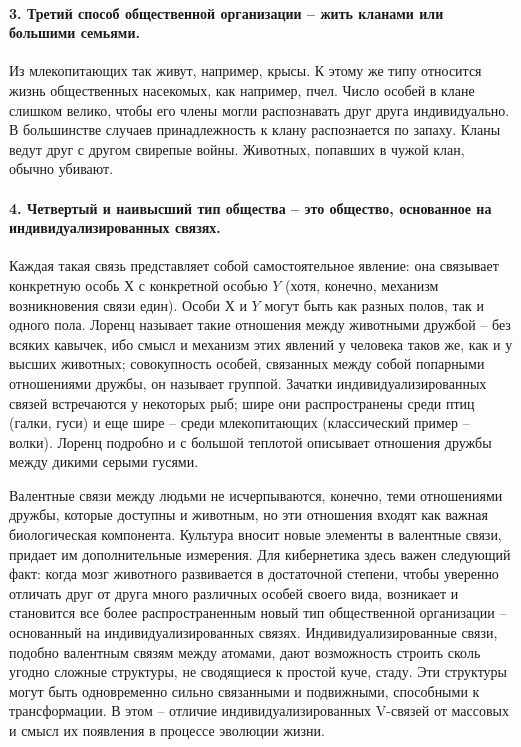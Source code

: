 \documentclass{book}
\begin{document}
\paragraph{3. Третий способ общественной организации -- жить клана­ми  или большими семьями.} Из млекопитающих так живут, например, крысы. К этому же типу относится жизнь обществен­ных насекомых, как например, пчел. Число особей в клане слишком велико, чтобы его члены могли распознавать друг друга индивидуально. В большинстве случаев принадлежность к клану распознается по запаху. Кланы ведут друг с другом свирепые войны. Животных, попавших в чужой клан, обычно убивают.

\paragraph{4. Четвертый и наивысший тип общества -- это общество, основанное на индивидуализированных связях.} Каждая такая связь представляет собой самостоятельное явление: она связывает конкретную особь $Х$  с конкретной особью $Y$  (хотя, конечно, механизм возникновения связи един). Особи $Х$  и $Y$  могут быть как разных полов, так и одного пола. Лоренц называет такие отношения между животными дружбой -- без всяких кавычек, ибо смысл и механизм этих явлений у человека таков же, как и у высших животных; совокупность особей, связан­ных между собой попарными отношениями дружбы, он называет группой.  Зачатки индивидуализированных связей встречаются у некоторых рыб; шире они распространены среди птиц (галки, гуси) и еще шире -- среди млекопитающих (классический пример -- волки). Лоренц подробно и с большой теплотой описывает отношения дружбы между дикими серыми гусями.

Валентные связи между людьми не исчерпываются, конеч­но, теми отношениями дружбы, которые доступны и животным, но эти отношения входят как важная биологическая компонен­та. Культура вносит новые элементы в валентные связи, при­дает им дополнительные измерения. Для кибернетика здесь ва­жен следующий факт: когда мозг животного развивается в до­статочной степени, чтобы уверенно отличать друг от друга много различных особей своего вида, возникает и становится все бо­лее распространенным новый тип общественной организации -- основанный на индивидуализированных связях. Индивидуали­зированные связи, подобно валентным связям между атомами, дают возможность строить сколь угодно сложные структуры, не сводящиеся к простой куче, стаду. Эти структуры могут быть одновременно сильно связанными и подвижными, способ­ными к трансформации. В этом -- отличие индивидуализирован­ных V-связей  от массовых и смысл их появления в процессе эволюции жизни.
\end{document}
